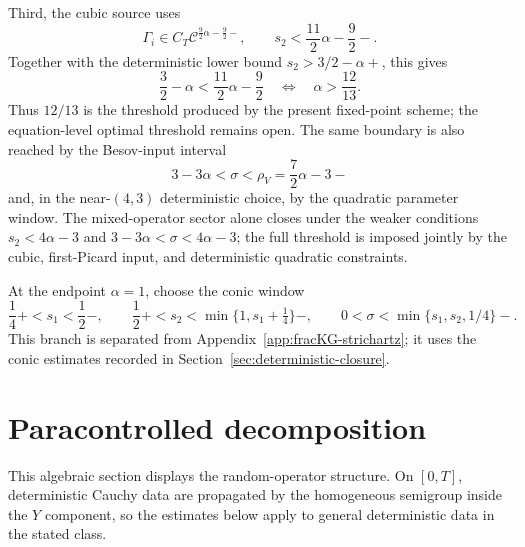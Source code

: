 \documentclass[10pt]{amsart}
\numberwithin{equation}{section}
\theoremstyle{plain}
\theoremstyle{definition}
\theoremstyle{remark}
\begin{document}
Third, the cubic source uses
\begin{equation}\label{eq:Gamma-regularity-constraints}
        \Gamma_i\in C_T\mathcal C^{\frac92\alpha-\frac92-},
        \qquad
        s_2<\frac{11}{2}\alpha-\frac92-.
\end{equation}
Together with the deterministic lower bound $s_2>3/2-\alpha+$, this gives
\begin{equation}\label{eq:alpha-threshold}
        \frac32-\alpha < \frac{11}{2}\alpha-\frac92
        \quad\Longleftrightarrow\quad
        \alpha>\frac{12}{13}.
\end{equation}
Thus \(12/13\) is the threshold produced by the present fixed-point scheme; the equation-level optimal threshold remains open.  The same boundary is also reached by the Besov-input interval
\[
        3-3\alpha<\sigma<\rho_V=\frac72\alpha-3-
\]
and, in the near-$(4,3)$ deterministic choice, by the quadratic parameter window.  The mixed-operator sector alone closes under the weaker conditions \(s_2<4\alpha-3\) and \(3-3\alpha<\sigma<4\alpha-3\); the full threshold is imposed jointly by the cubic, first-Picard input, and deterministic quadratic constraints.

At the endpoint \(\alpha=1\), choose the conic window
\begin{equation}\label{eq:conic-window}
        \frac14+<s_1<\frac12-,\qquad
        \frac12+<s_2<\min\{1,s_1+\tfrac14\}-,
        \qquad
        0<\sigma<\min\{s_1,s_2,1/4\}-.
\end{equation}
This branch is separated from Appendix~\ref{app:fracKG-strichartz}; it uses the conic estimates recorded in Section~\ref{sec:deterministic-closure}.

\section{Paracontrolled decomposition}\label{sec:paracontrolled}
This algebraic section displays the random-operator structure.  On $[0,T]$, deterministic Cauchy data are propagated by the homogeneous semigroup inside the $Y$ component, so the estimates below apply to general deterministic data in the stated class.
\end{document}
